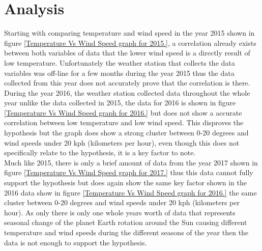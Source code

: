 \documentclass[12pt]{article}
\begin{document}

\pagebreak
\section{Analysis}

Starting with comparing temperature and wind speed in the year 2015 shown in figure \ref{Temperature Vs Wind Speed graph for 2015.}, a correlation already exists between both variables of data that the lower wind speed is a directly result of low temperature. Unfortunately the weather station that collects the data variables was off-line for a few months during the year 2015 thus the data collected from this year does not accurately prove that the correlation is there. \\

During the year 2016, the weather station collected data throughout the whole year unlike the data collected in 2015, the data for 2016 is shown in figure \ref{Temperature Vs Wind Speed graph for 2016.} but does not show a accurate correlation between low temperature and low wind speed. This disproves the hypothesis but the graph does show a strong cluster between 0-20 degrees and wind speeds under 20 kph (kilometers per hour), even though this does not specifically relate to the hypothesis, it is a key factor to note. \\

Much like 2015, there is only a brief amount of data from the year 2017 shown in figure \ref{Temperature Vs Wind Speed graph for 2017.} thus this data cannot fully support the hypothesis but does again show the same key factor shown in the 2016 data show in figure \ref{Temperature Vs Wind Speed graph for 2016.} the same cluster between 0-20 degrees and wind speeds under 20 kph (kilometers per hour). As only there is only one whole years worth of data that represents seasonal change of the planet Earth rotation around the Sun causing different temperature and wind speeds during the different seasons of the year then the data is not enough to support the hypothesis. \\
\end{document}
